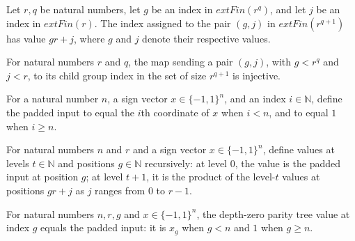 \begin{theorem}
\label{FABL.parityChildGroup_val}
\leanok
{}
Let $r,q$ be natural numbers, let $g$ be an index in $	ext{Fin}(r^q)$, and let $j$ be an
index in $	ext{Fin}(r)$. The index assigned to the pair $(g,j)$ in $	ext{Fin}(r^{q+1})$
has value $g r+j$, where $g$ and $j$ denote their respective values.
\end{theorem}

\begin{theorem}
\label{FABL.parityChildGroup_injective}
\leanok
{}
For natural numbers $r$ and $q$, the map sending a pair $(g,j)$, with $g<r^q$ and $j<r$,
to its child group index in the set of size $r^{q+1}$ is injective.
\end{theorem}

\begin{definition}
\label{FABL.paddedParityInput}
\leanok
{}
For a natural number $n$, a sign vector $x\in\{−1,1\}^n$, and an index $i\in\mathbb{N}$,
define the padded input to equal the $i$th coordinate of $x$ when $i<n$, and to equal
$1$ when $i\ge n$.
\end{definition}

\begin{definition}
\label{FABL.parityTreeValue}
\leanok
{}
For natural numbers $n$ and $r$ and a sign vector $x\in\{−1,1\}^n$, define values at
levels $t\in\mathbb{N}$ and positions $g\in\mathbb{N}$ recursively: at level $0$, the
value is the padded input at position $g$; at level $t+1$, it is the product of the
level-$t$ values at positions $gr+j$ as $j$ ranges from $0$ to $r-1$.
\end{definition}

\begin{theorem}
\label{FABL.parityTreeValue_zero}
\leanok
{}
For natural numbers $n,r,g$ and $x\in\{-1,1\}^n$, the depth-zero parity tree value at
index $g$ equals the padded input: it is $x_g$ when $g<n$ and $1$ when $g\ge n$.
\end{theorem}

